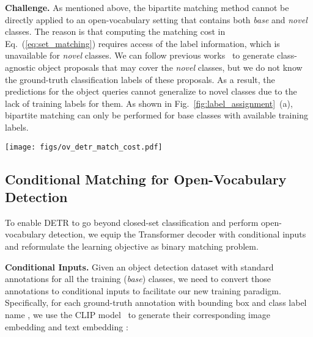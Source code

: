 \documentclass[runningheads]{llncs}
\begin{document}
\noindent \textbf{Challenge.} As mentioned above, the bipartite matching method cannot be directly applied to an open-vocabulary setting that contains both \emph{base} and \emph{novel} classes. The reason is that computing the matching cost in Eq.~(\ref{eq:set_matching}) requires access of the label information, which is unavailable for \emph{novel} classes.
We can follow previous works~\cite{gu2021open,xie2021zsd,du2022learning} to generate class-agnostic object proposals that may cover the \emph{novel} classes, but we do not know the ground-truth classification labels of these proposals.
As a result, the predictions for the  object queries cannot generalize to novel classes due to the lack of training labels for them.
As shown in Fig.~\ref{fig:label_assignment}~(a), bipartite matching can only be performed for base classes with available training labels.

\begin{figure*}[t]
\centering
\texttt{[image: figs/ov\_detr\_match\_cost.pdf]}
\caption{
\textbf{Comparing the label assignment mechanisms of DETR and our OV-DETR}.
\textbf{(a)} In the original DETR, the set-to-set prediction is conducted via bipartite matching between predictions and closed-set annotations, in which a cost matrix in respect of the queries and categories. Due to the absence of class label annotations for \emph{novel} classes, computing such a class-specific cost matrix is impossible.
\textbf{(b)} On the contrary, our OV-DETR casts the open-vocabulary detection as a conditional matching process and formulate a binary matching problem that computes a class-agnostic matching cost matrix for conditional inputs.
}
\label{fig:label_assignment}
\end{figure*}

\subsection{Conditional Matching for Open-Vocabulary Detection}\label{sec:conditional_matching}
\label{subsec:conditional_matching}
To enable DETR to go beyond closed-set classification and perform open-vocabulary detection, we equip the Transformer decoder with conditional inputs and reformulate the learning objective as binary matching problem.

\noindent \textbf{Conditional Inputs.} Given an object detection dataset with standard annotations for all the training (\emph{base}) classes, we need to convert those annotations to conditional inputs to facilitate our new training paradigm. Specifically, for each ground-truth annotation with bounding box  and class label name , we use the CLIP model~\cite{radford2021learning} to generate their corresponding image embedding  and text embedding :
\end{document}
